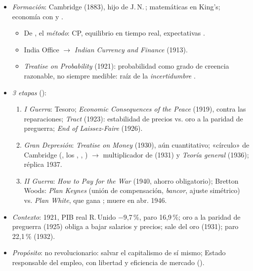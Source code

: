 \documentclass{article}
\begin{document}
\begin{columnas}
\begin{itemize}
\item \emph{Formación}: Cambridge (1883), hijo de J.\,N.\,; matemáticas en King's; economía con  y .
  \begin{itemize}
  \item De , el \emph{método}: CP, equilibrio en tiempo real, expectativas .
  \item India Office $\to$ \emph{Indian Currency and Finance} (1913).
  \item \emph{Treatise on Probability} (1921): probabilidad como grado de creencia razonable, no siempre medible: raíz de la \emph{incertidumbre} .
  \end{itemize}
\item \emph{3 etapas} ():
  \begin{enumerate}
  \item \emph{I Guerra}: Tesoro; \emph{Economic Consequences of the Peace} (1919), contra las reparaciones; \emph{Tract} (1923): estabilidad de precios vs. oro a la paridad de preguerra; \emph{End of Laissez-Faire} (1926).
  \item \emph{Gran Depresión}: \emph{Treatise on Money} (1930), aún cuantitativo; «círculo» de Cambridge (, los , , ) $\to$ multiplicador de  (1931) y \emph{Teoría general} (1936); réplica 1937.
  \item \emph{II Guerra}: \emph{How to Pay for the War} (1940, ahorro obligatorio); Bretton Woods: \emph{Plan Keynes} (unión de compensación, \emph{bancor}, ajuste simétrico) vs. \emph{Plan White}, que gana ; muere en abr. 1946.
  \end{enumerate}
\item \emph{Contexto}: 1921, PIB real R.\,Unido $-$9,7\,\%, paro 16,9\,\%; oro a la paridad de preguerra (1925) obliga a bajar salarios y precios; sale del oro (1931); paro 22,1\,\% (1932).
\item \emph{Propósito}: no revolucionario: salvar el capitalismo de sí mismo; Estado responsable del empleo, con libertad y eficiencia de mercado ().
\end{itemize}


\end{columnas}
\end{document}
